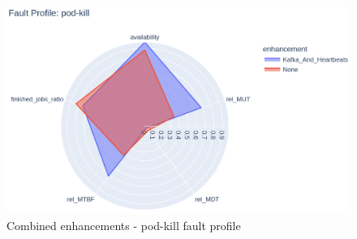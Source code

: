 \begin{figure}[h]
	\centering
	\includegraphics[width=140mm, keepaspectratio]{figures/kafka_and_hb_with_base_pod-kill.png}
	\caption{Combined enhancements - pod-kill fault profile}
	\label{fig:combined-results-pod-kill}
\end{figure}

